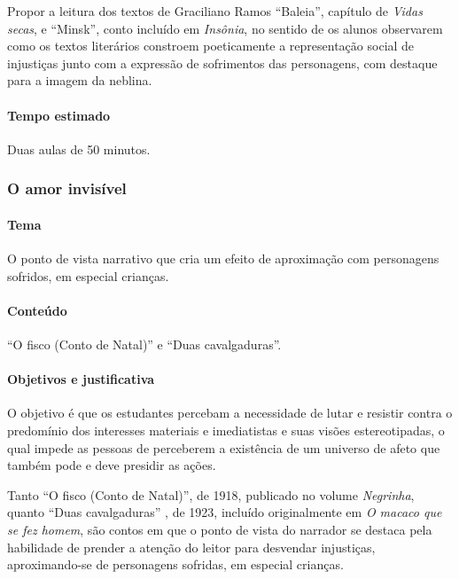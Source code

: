 \documentclass[11pt]{extarticle}
\begin{document}
Propor a leitura dos textos de Graciliano Ramos ``Baleia'', capítulo de
\emph{Vidas secas}, e ``Minsk'', conto incluído em \emph{Insônia}, no
sentido de os alunos observarem como os textos literários constroem
poeticamente a representação social de injustiças junto com a expressão
de sofrimentos das personagens, com destaque para a imagem da neblina.

\paragraph{Tempo estimado} Duas aulas de 50 minutos.

\subsubsection{O amor invisível}

\paragraph{Tema} O ponto de vista narrativo que cria um efeito de
aproximação com personagens sofridos, em especial crianças.

\paragraph{Conteúdo} ``O fisco (Conto de Natal)'' e ``Duas cavalgaduras''.

\paragraph{Objetivos e justificativa}
O objetivo é que os estudantes percebam a necessidade de lutar e
resistir contra o predomínio dos interesses materiais e imediatistas e
suas visões estereotipadas, o qual impede as pessoas de perceberem a
existência de um universo de afeto que também pode e deve presidir as
ações.

Tanto ``O fisco (Conto de Natal)'', de 1918, publicado no volume
\emph{Negrinha}, quanto ``Duas cavalgaduras'' , de 1923, incluído
originalmente em \emph{O macaco que se fez homem}, são contos em que o
ponto de vista do narrador se destaca pela habilidade de prender a
atenção do leitor para desvendar injustiças, aproximando-se de
personagens sofridas, em especial crianças.

\end{document}

